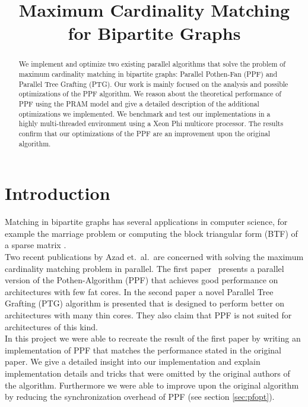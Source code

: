 \documentclass[letterpaper]{article}
\title{Maximum Cardinality Matching for Bipartite Graphs}
\begin{document}
%
\maketitle
%


\begin{abstract}

We implement and optimize two existing parallel algorithms that solve the problem of maximum cardinality matching in bipartite graphs: Parallel Pothen-Fan (PPF) and Parallel Tree Grafting (PTG). Our work is mainly focused on the analysis and possible optimizations of the PPF algorithm. We reason about the theoretical performance of PPF using the PRAM model and give a detailed description of the additional optimizations we implemented. We benchmark and test our implementations in a highly multi-threaded environment using a Xeon Phi multicore processor. The results confirm that our optimizations of the PPF are an improvement upon the original algorithm. 

\end{abstract}

\section{Introduction}\label{sec:intro}

Matching in bipartite graphs has several applications in computer science, for example the marriage problem or computing the block triangular 
form (BTF) of a sparse matrix \cite{Pothen:1990}.\\

Two recent publications by Azad et.\ al.\ are concerned with solving the maximum cardinality matching problem in parallel. 
The first paper~\cite{Azad:2012} presents a parallel version of the Pothen-Algorithm (PPF) that achieves good performance 
on architectures with few fat cores. In the second paper a novel Parallel Tree Grafting (PTG) algorithm is presented 
that is designed to perform better on architectures with many thin cores. 
They also claim that PPF is not suited for architectures of this kind.\\

In this project we were able to recreate the result of the first paper \cite{Azad:2012} by writing an implementation of PPF
that matches the performance stated in the original paper. We give a detailed insight into our implementation and explain
implementation details and tricks that were omitted by the original authors of the algorithm. 
Furthermore we were able to improve upon the original algorithm by reducing the synchronization overhead of PPF (see section \ref{sec:pfopt}).\\
\end{document}
